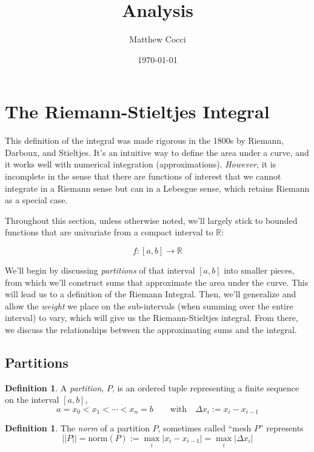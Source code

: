 \documentclass[12pt]{article}
\author{Matthew Cocci}
\title{\textbf{Analysis}}
\date{\today}
\theoremstyle{plain}
\theoremstyle{definition}
\newtheorem{defn}[thm]{Definition}
\theoremstyle{remark}
\begin{document}
\maketitle

\tableofcontents %

\newpage
\section{The Riemann-Stieltjes Integral}

This definition of the integral was made rigorous in the 1800s by
Riemann, Darboux, and Stieltjes.  It's an intuitive way to define the
area under a curve, and it works well with numerical integration
(approximations). \emph{However}, it is incomplete in the sense that
there are functions of interest that we cannot integrate in a Riemann
sense but can in a Lebesgue sense, which retains Riemann as a special
case.

Throughout this section, unless otherwise noted, we'll largely stick to bounded functions that are univariate from a compact interval to $\mathbb{R}$: 

    \[ f: [a, b] \rightarrow \mathbb{R} \]

    We'll begin by discussing \emph{partitions} of that interval $[a,b]$ into smaller pieces, from which we'll construct sums that approximate the area under the curve.  This will lead us to a definition of the Riemann Integral.  Then, we'll generalize and allow the \emph{weight} we place on the sub-intervals (when summing over the entire interval) to vary, which will give us the Riemann-Stieltjes integral. From there, we discuss the relationships between the approximating sums and the integral.

\subsection{Partitions}

\begin{defn} A \emph{partition}, $P$, is an ordered tuple representing a finite sequence on the interval $[a,b]$,
    \[ a = x_0 < x_1 < \cdots < x_n = b
        \qquad \text{with} \quad \Delta x_i := x_i - x_{i-1}
    \]
\end{defn}

\begin{defn} The \emph{norm} of a partition $P$, sometimes called ``mesh $P$'' represents
    \[ || P || = \text{norm}(P) := \max_i |x_i - x_{i-1}| =
        \max_i |\Delta x_i| \] 
\end{defn}
\end{document}
